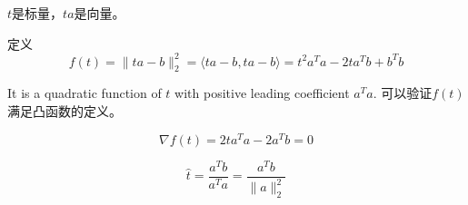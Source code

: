     \begin{remark}
        $t$是标量，$ta$是向量。
    \end{remark}

    定义
    \begin{equation} f(t)=\|t a-b\|_{2}^{2}=\langle t a-b, t a-b\rangle=t^{2} a^{T} a-2 t a^{T} b+b^{T} b \end{equation}

    It is a quadratic function of $ t $ with positive leading coefficient $ a^{T} a $. 可以验证$f(t)$满足凸函数的定义。

    \begin{equation} \nabla f(t)=2 t a^{T} a-2 a^{T} b=0 \end{equation}

    \begin{equation} \hat{t}=\frac{a^{T} b}{a^{T} a}=\frac{a^{T} b}{\|a\|_{2}^{2}} \end{equation}





